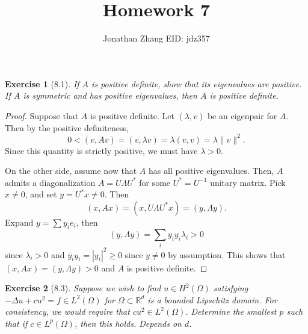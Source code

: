 \documentclass[letterpaper,twoside,11pt]{article}
\theoremstyle{mystyle}
\newtheorem*{exercise}{Exercise}
\newcommand{\R}{{\mathbb R}}
\newcommand{\inv}{^{-1}}
\begin{document}
\title{\vspace{-2\baselineskip} 
Homework 7
}
\author{Jonathan Zhang \qquad EID: { jdz357} }
\date{}
\maketitle



\begin{exercise}[8.1]
  If $A$ is positive definite, show that its eigenvalues are positive. If $A$ is symmetric and has positive eigenvalues, then $A$ is positive definite. 
\end{exercise}

\begin{proof}
  Suppose that $A$ is positive definite. Let $\left( \lambda, v \right)$ be an eigenpair for $A$. Then by the positive definiteness, 
    \[0<\left( v, Av \right) = \left( v, \lambda v \right) = \lambda \left( v, v \right) = \lambda \|v\|^2.\]
    Since this quantity is strictly positive, we must have $\lambda >0$. 

  On the other side, 
  assume now that $A$ has all positive eigenvalues. Then, $A$ admits a diagonalization $A= U \Lambda U^*$ for some $U^* = U\inv$ unitary matrix. Pick $x \neq 0$, and set $y = U^* x \neq 0$. Then 
    \[\left( x, Ax \right) = \left( x, U \Lambda U^* x \right) = \left( y, \Lambda y \right).\] 
    Expand $y = \sum y_i e_i$, then 
    \[\left( y, \Lambda y \right) = \sum_{i} \overline{y_i} y_i \lambda _i >0\] since $\lambda_i >0$ and $\overline{y_i}y_i = |y_i|^2 \geq 0 $ since $y \neq 0$ by assumption. This shows that $\left( x, Ax \right) = \left( y, \Lambda y \right) >0$ and $A$ is positive definite. 

\end{proof}






\newpage 
\begin{exercise}[8.3]
Suppose we wish to find $u \in H^2 \left( \Omega \right)$ satisfying $-\Delta u + cu^2 = f \in L^2 \left( \Omega \right)$ for $\Omega \subset \R^d$ is a bounded Lipschitz domain. For consistency, we would require that $cu^2 \in L^2 \left( \Omega \right)$. Determine the smallest $p$ such that if $c \in L^p (\Omega)$, then this holds. Depends on $d$. 
\end{exercise}
\end{document}
